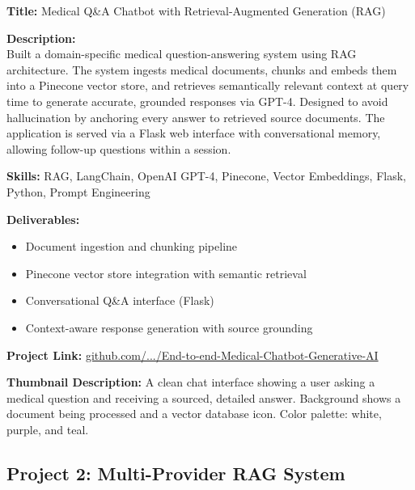 \documentclass[11pt,a4paper]{article}
\newcommand{\projectentry}[1]{%
  \begin{mdframed}[backgroundcolor=LightGray, linecolor=VividPurple, linewidth=1pt,
    topline=false, bottomline=false, rightline=false,
    innerleftmargin=10pt, innerrightmargin=10pt, innertopmargin=8pt, innerbottommargin=8pt,
    skipabove=8pt, skipbelow=4pt]
  #1
  \end{mdframed}
}
\begin{document}
\projectentry{
\textbf{\textcolor{VividPurple}{Title:}} Medical Q\&A Chatbot with Retrieval-Augmented Generation (RAG)

\medskip
\textbf{\textcolor{VividPurple}{Description:}}\\
Built a domain-specific medical question-answering system using RAG architecture. The system ingests medical documents, chunks and embeds them into a Pinecone vector store, and retrieves semantically relevant context at query time to generate accurate, grounded responses via GPT-4. Designed to avoid hallucination by anchoring every answer to retrieved source documents. The application is served via a Flask web interface with conversational memory, allowing follow-up questions within a session.

\medskip
\textbf{\textcolor{VividPurple}{Skills:}} RAG, LangChain, OpenAI GPT-4, Pinecone, Vector Embeddings, Flask, Python, Prompt Engineering

\medskip
\textbf{\textcolor{VividPurple}{Deliverables:}}
\begin{itemize}
  \item Document ingestion and chunking pipeline
  \item Pinecone vector store integration with semantic retrieval
  \item Conversational Q\&A interface (Flask)
  \item Context-aware response generation with source grounding
\end{itemize}

\textbf{\textcolor{VividPurple}{Project Link:}} \href{https://github.com/adebanjioluwatimileyin/generative-ai-portfolio/blob/main/End-to-End-AI-Applications/End-to-end-Medical-Chatbot-Generative-AI}{github.com/.../End-to-end-Medical-Chatbot-Generative-AI}

\medskip
\textbf{\textcolor{VividPurple}{Thumbnail Description:}} A clean chat interface showing a user asking a medical question and receiving a sourced, detailed answer. Background shows a document being processed and a vector database icon. Color palette: white, purple, and teal.
}

\subsection{Project 2: Multi-Provider RAG System}
\end{document}
